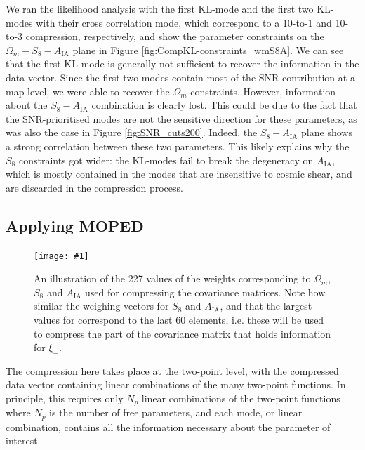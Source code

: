 \documentclass[twocolumn]{\docclass}
\newcommand{\sfig}[2]{
	\texttt{[image: \#1]}
}
\newcommand{\Svwide}[2]{
	\begin{figure}[thbp]
		\sfig{../figures/#1.pdf}{\textwidth}
		\caption{{\small #2}}
		\label{fig:#1}
	\end{figure}
}
\newcommand{\rf}[1]{Figure \ref{fig:#1}}
\begin{document}
	
	We ran the likelihood analysis with the first KL-mode and the first two KL-modes with their cross correlation mode, which correspond to a 10-to-1 and 10-to-3 compression, respectively, and show the parameter constraints on the $\Omega_m - S_8 - A_{\mathrm{IA}}$ plane in Figure \ref{fig:CompKL-constraints_wmS8A}. We can see that the first KL-mode is generally not sufficient to recover the information in the data vector. Since the first two modes contain most of the SNR contribution at a map level, we were able to recover the $\Omega_m$ constraints. However, information about the $S_8-A_{\mathrm{IA}}$ combination is clearly lost. This could be due to the fact that the SNR-prioritised modes are not the sensitive direction for these parameters, as was also the case in \rf{SNR_cuts200}. Indeed, the $S_8 - A_{\mathrm{IA}}$ plane shows a strong correlation between these two parameters. This likely explains why the $S_8$ constraints got wider: the KL-modes fail to break the degeneracy on $A_{\mathrm{IA}}$, which is mostly contained in the modes that are insensitive to cosmic shear, and are discarded in the compression process.
	
	\subsection{Applying MOPED}
	\label{subsec:2pt_compression}
	
	\Svwide{Weights_2pt}{An illustration of the 227 values of the weights corresponding to $\Omega_m$, $S_8$ and $A_{\mathrm{IA}}$ used for compressing the covariance matrices. Note how similar the weighing vectors for $S_8$ and $A_{\mathrm{IA}}$, and that the largest values for correspond to the last 60 elements, i.e. these will be used to compress the part of the covariance matrix that holds information for $\xi_-$.}
	
	The compression here takes place at the two-point level, with the compressed data vector containing linear combinations of the many two-point functions. In principle, this requires only $N_p$ linear combinations of the two-point functions where $N_p$ is the number of free parameters, and each mode, or linear combination, contains all the information necessary about the parameter of interest. 
	
\end{document}
